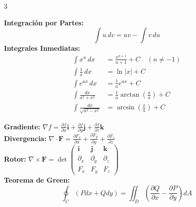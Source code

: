 \documentclass[9pt, letterpaper, landscape]{article}
\begin{document}
\begin{multicols*}{3}
  \begin{tcolorbox}[title=Integrales Indefinidas y Métodos, colframe=accent]
    \textbf{Integración por Partes:}
    \begin{equation*}
      \int u \, dv = u v - \int v \, du
    \end{equation*}
    \textbf{Integrales Inmediatas:}
    \begin{align*}
      \int x^n \, dx &= \frac{x^{n+1}}{n+1} + C \quad (n \ne -1) \\
      \int \frac{1}{x} \, dx &= \ln|x| + C \\
      \int e^{ax} \, dx &= \frac{1}{a} e^{ax} + C \\
      \int \frac{dx}{a^2 + x^2} &= \frac{1}{a} \arctan\left(\frac{x}{a}\right) + C \\
      \int \frac{dx}{\sqrt{a^2 - x^2}} &= \arcsin\left(\frac{x}{a}\right) + C
    \end{align*}
  \end{tcolorbox}

  \begin{tcolorbox}[title=Operadores Diferenciales y Vectorial, colframe=darkblue]
    \textbf{Gradiente:} $\nabla f = \frac{\partial f}{\partial x}\mathbf{i} + \frac{\partial f}{\partial y}\mathbf{j} + \frac{\partial f}{\partial z}\mathbf{k}$ \\
    \textbf{Divergencia:} $\nabla \cdot \mathbf{F} = \frac{\partial F_x}{\partial x} + \frac{\partial F_y}{\partial y} + \frac{\partial F_z}{\partial z}$ \\
    \textbf{Rotor:} $\nabla \times \mathbf{F} = \det\begin{pmatrix} \mathbf{i} & \mathbf{j} & \mathbf{k} \\ \partial_x & \partial_y & \partial_z \\ F_x & F_y & F_z \end{pmatrix}$ \\
    \textbf{Teorema de Green:}
    \begin{equation*}
      \oint_C (P dx + Q dy) = \iint_D \left(\frac{\partial Q}{\partial x} - \frac{\partial P}{\partial y}\right) dA
    \end{equation*}
  \end{tcolorbox}


\end{multicols*}
\end{document}
